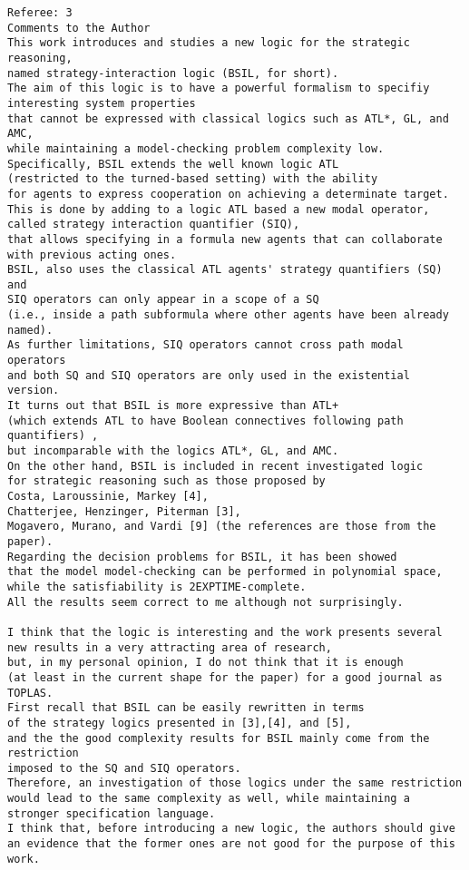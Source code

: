 \documentclass[11pt]{article}
\begin{document}
\begin{verbatim} 
Referee: 3 
Comments to the Author 
This work introduces and studies a new logic for the strategic reasoning, 
named strategy-interaction logic (BSIL, for short). 
The aim of this logic is to have a powerful formalism to specifiy interesting system properties 
that cannot be expressed with classical logics such as ATL*, GL, and AMC, 
while maintaining a model-checking problem complexity low. 
Specifically, BSIL extends the well known logic ATL 
(restricted to the turned-based setting) with the ability 
for agents to express cooperation on achieving a determinate target. 
This is done by adding to a logic ATL based a new modal operator, 
called strategy interaction quantifier (SIQ), 
that allows specifying in a formula new agents that can collaborate with previous acting ones. 
BSIL, also uses the classical ATL agents' strategy quantifiers (SQ) and 
SIQ operators can only appear in a scope of a SQ 
(i.e., inside a path subformula where other agents have been already named). 
As further limitations, SIQ operators cannot cross path modal operators 
and both SQ and SIQ operators are only used in the existential version. 
It turns out that BSIL is more expressive than ATL+ 
(which extends ATL to have Boolean connectives following path quantifiers) , 
but incomparable with the logics ATL*, GL, and AMC. 
On the other hand, BSIL is included in recent investigated logic 
for strategic reasoning such as those proposed by 
Costa, Laroussinie, Markey [4], 
Chatterjee, Henzinger, Piterman [3],
Mogavero, Murano, and Vardi [9] (the references are those from the paper). 
Regarding the decision problems for BSIL, it has been showed 
that the model model-checking can be performed in polynomial space, 
while the satisfiability is 2EXPTIME-complete. 
All the results seem correct to me although not surprisingly. 

I think that the logic is interesting and the work presents several 
new results in a very attracting area of research, 
but, in my personal opinion, I do not think that it is enough 
(at least in the current shape for the paper) for a good journal as TOPLAS. 
First recall that BSIL can be easily rewritten in terms 
of the strategy logics presented in [3],[4], and [5], 
and the the good complexity results for BSIL mainly come from the restriction 
imposed to the SQ and SIQ operators. 
Therefore, an investigation of those logics under the same restriction 
would lead to the same complexity as well, while maintaining a stronger specification language. 
I think that, before introducing a new logic, the authors should give 
an evidence that the former ones are not good for the purpose of this work. 
\end{verbatim}
\end{document}
